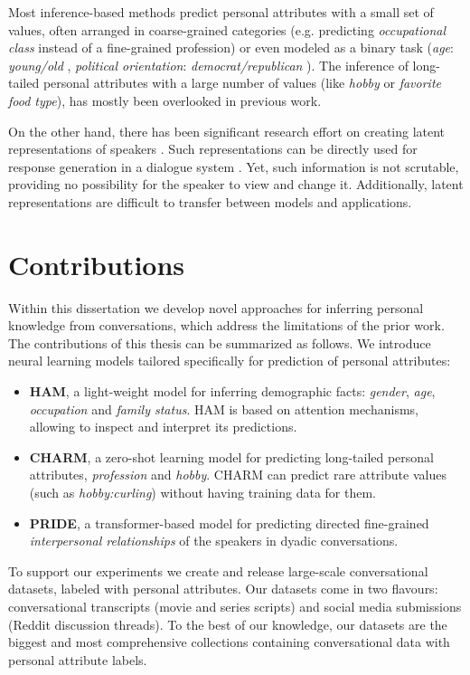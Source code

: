 Most inference-based methods predict personal attributes with a small set of values, often arranged in coarse-grained categories (e.g. predicting \textit{occupational class} instead of a fine-grained profession) or even modeled as a binary task (\textit{age}: \textit{young/old} \cite{liesenfeld2020predicting}, \textit{political orientation}: \textit{democrat/republican} \cite{preoctiuc2017beyond}). The inference of long-tailed personal attributes with a large number of values (like \textit{hobby} or \textit{favorite food type}), has mostly been overlooked in previous work.

On the other hand, there has been significant research effort on creating latent representations of speakers \cite{li2016persona, AIIDElin11}. Such representations can be directly used for response generation in a dialogue system \cite{zheng2019personalized}. Yet, such information is not scrutable, providing no possibility for the speaker to view and change it. Additionally, latent representations are difficult to transfer between models and applications.

\section{Contributions}

Within this dissertation we develop novel approaches for inferring personal knowledge from conversations, which address the limitations of the prior work. The contributions of this thesis can be summarized as follows. We introduce neural learning models tailored specifically for prediction of personal attributes:
\begin{itemize}
    \item \textbf{HAM}, a light-weight model for inferring demographic facts: \textit{gender}, \textit{age}, \textit{occupation} and \textit{family status}. HAM is based on attention mechanisms, allowing to inspect and interpret its predictions.
    \item \textbf{CHARM}, a zero-shot learning model for predicting long-tailed personal attributes, \textit{profession} and \textit{hobby}. CHARM can predict rare attribute values (such as \textit{hobby:curling}) without having training data for them.
    \item \textbf{PRIDE}, a transformer-based model for predicting directed fine-grained \textit{interpersonal relationships} of the speakers in dyadic conversations.
\end{itemize}

To support our experiments we create and release large-scale conversational datasets, labeled with personal attributes. Our datasets come in two flavours: conversational transcripts (movie and series scripts) and social media submissions (Reddit discussion threads). To the best of our knowledge, our datasets are the biggest and most comprehensive collections containing conversational data with personal attribute labels.

